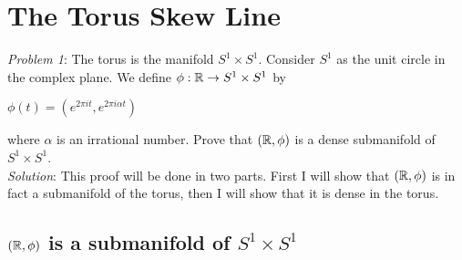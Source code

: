 \section{The Torus Skew Line}

\emph{Problem 1}: The torus is the manifold $S^1 \times S^1$. Consider $S^1$ as 
the unit circle in the complex plane. We define $\phi: \mathbb{R} \to S^1 \times S^1$ by

\begin{center}
$\phi(t) = (e^{2 \pi it}, e^{2 \pi i\alpha t})$
\end{center}

where $\alpha$ is an irrational number. Prove that $(\mathbb{R}, \phi)$ is a dense
submanifold of $S^1 \times S^1$.
\\
\emph{Solution}:
This proof will be done in two parts. First I will show that $(\mathbb{R}, \phi)$ is in
fact a submanifold of the torus, then I will show that it is dense in the torus.


\subsection*{$(\mathbb{R},\phi)$ is a submanifold of $S^1 \times S^1$}

